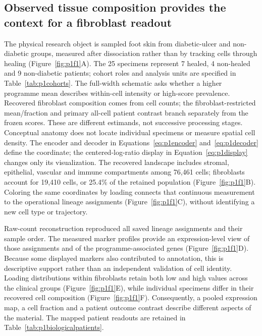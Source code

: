 \subsection{Observed tissue composition provides the context for a fibroblast readout}



The physical research object is sampled foot skin from diabetic-ulcer and non-diabetic groups, measured after dissociation rather than by tracking cells through healing (Figure~\ref{fig:p1f1}A\label{call:p1f1}). The 25 specimens represent 7 healed, 4 non-healed and 9 non-diabetic patients; cohort roles and analysis units are specified in Table~\ref{tab:p1cohorts}. The full-width schematic asks whether a higher programme mean describes within-cell intensity or high-score prevalence. Recovered fibroblast composition comes from cell counts; the fibroblast-restricted mean/fraction and primary all-cell patient contrast branch separately from the frozen scores. These are different estimands, not successive processing stages. Conceptual anatomy does not locate individual specimens or measure spatial cell density. The encoder and decoder in Equations~\eqref{eq:p1encoder} and~\eqref{eq:p1decoder} define the coordinate; the centered-log-ratio display in Equation~\eqref{eq:p1display} changes only its visualization. The recovered landscape includes stromal, epithelial, vascular and immune compartments among 76,461 cells; fibroblasts account for 19,410 cells, or 25.4\% of the retained population (Figure~\ref{fig:p1f1}B). Coloring the same coordinates by loading connects that continuous measurement to the operational lineage assignments (Figure~\ref{fig:p1f1}C), without identifying a new cell type or trajectory.

Raw-count reconstruction reproduced all saved lineage assignments and their sample order. The measured marker profiles provide an expression-level view of those assignments and of the programme-associated genes (Figure~\ref{fig:p1f1}D). Because some displayed markers also contributed to annotation, this is descriptive support rather than an independent validation of cell identity. Loading distributions within fibroblasts retain both low and high values across the clinical groups (Figure~\ref{fig:p1f1}E), while individual specimens differ in their recovered cell composition (Figure~\ref{fig:p1f1}F). Consequently, a pooled expression map, a cell fraction and a patient outcome contrast describe different aspects of the material. The mapped patient readouts are retained in Table~\ref{tab:p1biologicalpatients}.

